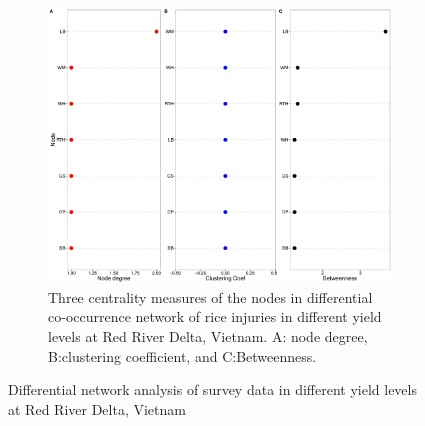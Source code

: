 \begin{figure}
\begin{subfigure}[b]{1\textwidth}
        \includegraphics[width = 1\textwidth]{figures/yield_dif_nodepropRed_River_Delta/yield_dif_nodepropRed_River_Delta.pdf}
        \caption[Three centrality measures of the nodes in differential co-occurrence network of rice injuries in different yield levels at Red River Delta, Vietnam]{Three centrality measures of the nodes in differential co-occurrence network of rice injuries in different yield levels at Red River Delta, Vietnam. A: node degree, B:clustering coefficient, and C:Betweenness.}
        \label{fig:nodepropdifyield_RR}
    \end{subfigure}
    \caption{Differential network analysis of survey data in different yield levels at Red River Delta, Vietnam}
    \label{fig:difyield_RR}
\end{figure}
 

